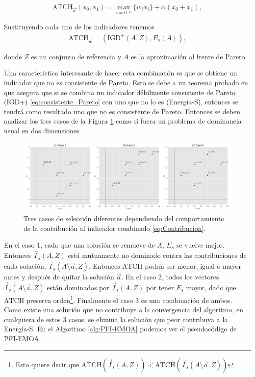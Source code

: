 \begin{equation} \label{eq:ATCH}
    \text{ATCH}_{\vec{w}}(x_0,x_1)=\max_{i=0,1} \{w_ix_i\}+\alpha (x_0+x_1),  
\end{equation}


Sustituyendo cada uno de los indicadores tenemos
\begin{align*}
\text{ATCH}_{\vec{w}}=({\text{IGD}}^+(A,Z),E_s(A)), \nonumber
\end{align*}

donde $Z$ es un conjunto de referencia y $A$ es la aproximación al frente de Pareto.

Una característica interesante de hacer esta combinación es que se obtiene un indicador que no es consistente de Pareto. Esto se debe a un teorema probado en \cite{falcon-cardonaConstructionParetoCompliantCombined2022} que asegura que si se combina un indicador débilmente consistente de Pareto (IGD+) \eqref{eq:consistente_Pareto} con uno que no lo es (Energía-S), entonces se tendrá como resultado uno que no es consistente de Pareto. Entonces se deben analizar los tres casos de la Figura \ref{fig:casos} como si fuera un problema de dominancia usual en dos dimensiones.

\begin{figure}[H]
    \centering
    \includegraphics[width=\textwidth]{Figuras/casos.pdf}
    \caption[Tres casos para PFI.emoa]{Tres casos de selección diferentes dependiendo del comportamiento de la contribución al indicador combinado \eqref{eq:Contribucion}.}
    \label{fig:casos}
\end{figure}


En el caso 1, cada que una solución se remueve de $A$, $E_s$ se vuelve mejor. Entonces $\vec{I}_s(A,Z)$ está mutuamente no dominado contra las contribuciones de cada solución, $\vec{I}_s(A \setminus {\vec{a}},Z)$. Entonces $\text{ATCH}$ podría ser menor, igual o mayor antes y después de quitar la solución $\vec{a}$. En el caso 2, todos los vectores  $\vec{I}_s(A \setminus {\vec{a}},Z)$ están dominados por  $\vec{I}_s(A ,Z)$ por tener $E_s$ mayor, dado que $\text{ATCH}$ preserva orden\footnote{Esto quiere decir que $\text{ATCH}(\vec{I}_s(A,Z))< \text{ATCH}(\vec{I}_s(A \setminus {\vec{a}},Z))$}. Finalmente el caso 3 es una combinación de ambos. Como existe una solución que no contribuye a la convergencia del algoritmo, en cualquiera de estos 3 casos, se elimina la solución que peor contribuya a la Energía-S. En el Algoritmo \ref{alg:PFI-EMOA} podemos ver el pseudocódigo de PFI-EMOA.



